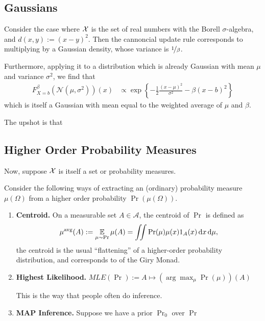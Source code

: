 \documentclass{article}
\begin{document}
\subsection{Gaussians}
Consider the case where $\mathcal X$ is the set of real numbers with the Borell $\sigma$-algebra, and $d(x,y) := (x-y)^2$.
Then the cannoncial update rule corresponds to multiplying by a Gaussian density, whose variance is $\nicefrac1\beta$.

Furthermore, applying it to a distribution which is already Gaussian with mean $\mu$ and variance $\sigma^2$, we find that
\begin{align*}
    F^{\beta}_{X=b}(\mathcal N(\mu, \sigma^2))(x) &\propto
     \exp\left\{ - \frac12 \frac{(x-\mu)^2}{ \sigma^2 } - \beta(x-b)^2\right\}
\end{align*}
which is itself a Gaussian with mean equal to the weighted average of $\mu$ and $\beta$. 

The upshot is that 


\subsection{Higher Order Probability Measures}
Now, suppose $\mathcal X$ is itself a set or probability measures. 

Consider the following ways of extracting an (ordinary) probability measure $\mu(\Omega)$
from a higher order probability $\Pr(\mu(\Omega))$.

\begin{enumerate}
    \item \textbf{Centroid.}
        On a measurable set $A \in \mathcal A$, the centroid of $\Pr$ is defined as
        \[
            \mu^{\text{avg}}(A) := \operatorname*{\mathbb{E}}_{\mu \sim \Pr} \mu(A) =
                \iint \Pr(\mu) \mu(x) 1_{A}(x)\, \mathrm d x\,\mathrm d\mu,
        \]
        the centroid is the usual ``flattening'' of a higher-order probability distribution, and corresponds to
        of the Giry Monad.

    \item \textbf{Highest Likelihood.}
        $\textit{MLE}(\Pr) := A \mapsto (\arg\max_\mu \Pr(\mu))(A)$

        This is the way that people often do inference.

    \item \textbf{MAP Inference.}
        Suppose we have a prior $\Pr_0$ over  $\Pr$

\end{enumerate}
\end{document}
